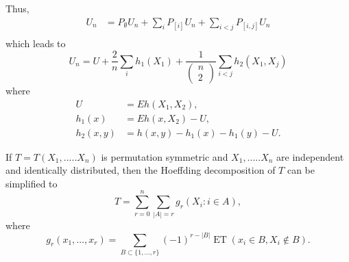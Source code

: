 \begin{solution}
    Thus,
    \begin{equation*}
        \begin{split}
            U_{n} & = P_{\emptyset} U_n +  \sum_i P_{[i]} U_n + \sum_{i<j} P_{[i, j]} U_n\\
        \end{split}
    \end{equation*}
    which leads to
    \begin{equation*}
        U_{n}=U+\frac{2}{n} \sum_{i} h_{1}\left(X_1\right)+\frac{1}{\begin{pmatrix} n\\2   \end{pmatrix}} \sum_{i<j} h_{2}\left(X_1, X_{j}\right)
    \end{equation*}
    where
    \begin{equation*}
        \begin{split}
            U & =  E h\left(X_{1}, X_{2}\right), \\
            h_{1}(x) & =  E h\left(x, X_{2}\right)-U, \\ 
            h_{2}(x, y) & =  h(x, y)-h_{1}(x)-h_{1}(y)-U.
        \end{split}
    \end{equation*}
\end{solution}




\begin{problem}

    If $T = T (X_1, . . . ..X_n)$ is permutation symmetric and $X_1, . . . ..X_n$ are independent and identically distributed, then the Hoeffding decomposition of $T$ can be simplified to 
    \begin{equation*}
        T=\sum_{r=0}^{n} \sum_{|A|=r} g_{r}\left(X_{i}: i \in A\right),
    \end{equation*}
    where 
    \begin{equation*}
        g_{r}\left(x_{1}, \ldots, x_{r}\right)=\sum_{B \subset\{1, \ldots, r\}}(-1)^{r-|B|} \operatorname{ET}\left(x_{i} \in B, X_{i} \notin B\right).
    \end{equation*}
\end{problem}



